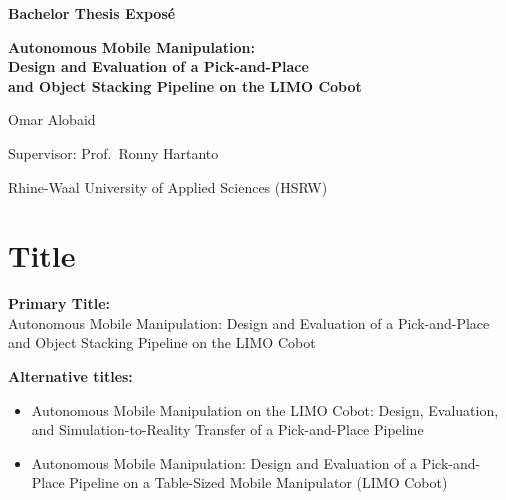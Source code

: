 \documentclass[11pt,a4paper]{article}
\begin{document}
\begin{center}
    \vspace*{0.8cm}
    {\Huge\bfseries\color{heading} Bachelor Thesis Expos\'{e}\par}
    \vspace{0.6cm}
    {\Large\bfseries\color{primary}
        Autonomous Mobile Manipulation:\\[0.2em]
        Design and Evaluation of a Pick-and-Place\\[0.2em]
        and Object Stacking Pipeline on the LIMO Cobot\par}
    \vspace{1.0cm}
    {\large Omar Alobaid\par}
    \vspace{0.2cm}
    {\large Supervisor: Prof.\ Ronny Hartanto\par}
    \vspace{0.2cm}
    {\large Rhine-Waal University of Applied Sciences (HSRW)\par}
    \vspace*{1.2cm}
\end{center}

\section{Title}

\begin{tcolorbox}[colback=boxbg, colframe=primary, arc=3pt, boxrule=1.5pt,
    left=1em, right=1em, top=0.8em, bottom=0.8em]
    \textbf{Primary Title:}\\[0.4em]
    {\large Autonomous Mobile Manipulation: Design and Evaluation of a
    Pick-and-Place and Object Stacking Pipeline on the LIMO Cobot}
\end{tcolorbox}

\vspace{0.4em}
\noindent\textbf{Alternative titles:}
\begin{itemize}[label=\textbullet, leftmargin=1.5em, itemsep=0.1em]
    \item Autonomous Mobile Manipulation on the LIMO Cobot: Design, Evaluation, and
          Simulation-to-Reality Transfer of a Pick-and-Place Pipeline
    \item Autonomous Mobile Manipulation: Design and Evaluation of a Pick-and-Place
          Pipeline on a Table-Sized Mobile Manipulator (LIMO Cobot)
\end{itemize}
\end{document}

